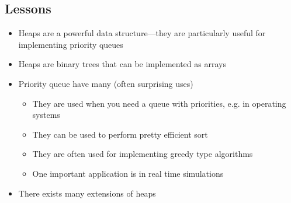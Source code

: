 
\begin{slide}
\section[-1]{Lessons}

\begin{PauseHighLight}
  \begin{itemize}
  \item Heaps are a powerful data structure---they are particularly
    useful for implementing priority queues\pause
  \item Heaps are binary trees that can be implemented as arrays\pause
  \item Priority queue have many (often surprising uses)\pause
    \begin{itemize}
    \item They are used when you need a queue with priorities, e.g. in
      operating systems\pause
    \item They can be used to perform pretty efficient sort\pause
    \item They are often used for implementing greedy type
      algorithms\pause
    \item One important application is in real time simulations\pause
    \end{itemize}
  \item There exists many extensions of heaps\pause
  \end{itemize}
\end{PauseHighLight}

\end{slide}


